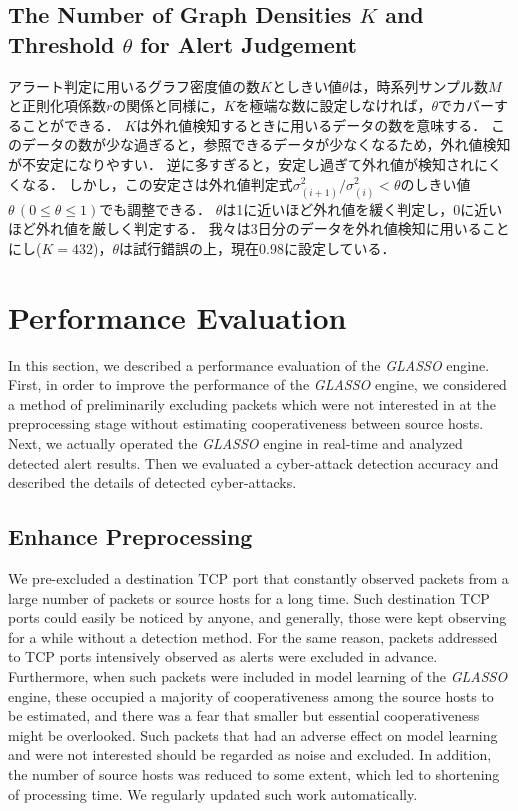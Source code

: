 \documentclass[conference]{IEEEtran}
\begin{document}
\subsection{The Number of Graph Densities $K$ and Threshold $\theta$ for Alert Judgement}
アラート判定に用いるグラフ密度値の数$K$としきい値$\theta$は，時系列サンプル数$M$と正則化項係数$r$の関係と同様に，$K$を極端な数に設定しなければ，$\theta$でカバーすることができる．
$K$は外れ値検知するときに用いるデータの数を意味する．
このデータの数が少な過ぎると，参照できるデータが少なくなるため，外れ値検知が不安定になりやすい．
逆に多すぎると，安定し過ぎて外れ値が検知されにくくなる．
しかし，この安定さは外れ値判定式$\sigma^{2}_{(i+1)}/\sigma^{2}_{(i)}<\theta$のしきい値$\theta \, (0\leq \theta \leq 1)$でも調整できる．
$\theta$は1に近いほど外れ値を緩く判定し，0に近いほど外れ値を厳しく判定する．
我々は3日分のデータを外れ値検知に用いることにし($K=432$)，$\theta$は試行錯誤の上，現在0.98に設定している．




\section{Performance Evaluation}
In this section, we described a performance evaluation of the {\it GLASSO} engine.
First, in order to improve the performance of the {\it GLASSO} engine, we considered a method of preliminarily excluding packets which were not interested in at the preprocessing stage without estimating cooperativeness between source hosts.
Next, we actually operated the {\it GLASSO} engine in real-time and analyzed detected alert results.
Then we evaluated a cyber-attack detection accuracy and described the details of detected cyber-attacks.


\subsection{Enhance Preprocessing}
We pre-excluded a destination TCP port that constantly observed packets from a large number of packets or source hosts for a long time.
Such destination TCP ports could easily be noticed by anyone, and generally, those were kept observing for a while without a detection method.
For the same reason, packets addressed to TCP ports intensively observed as alerts were excluded in advance.
Furthermore, when such packets were included in model learning of the {\it GLASSO} engine, these occupied a majority of cooperativeness among the source hosts to be estimated, and there was a fear that smaller but essential cooperativeness might be overlooked.
Such packets that had an adverse effect on model learning and were not interested should be regarded as noise and excluded.
In addition, the number of source hosts was reduced to some extent, which led to shortening of processing time.
We regularly updated such work automatically.
\end{document}
